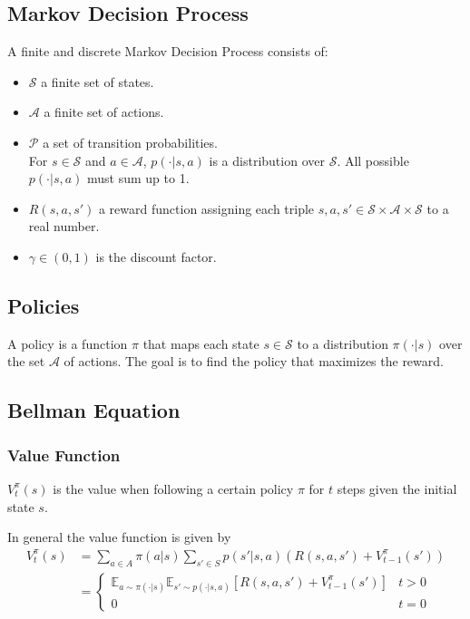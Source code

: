 
\subsection{Markov Decision Process}

A finite and discrete Markov Decision Process consists of:

\begin{itemize}
    \item $\mathcal{S}$ a finite set of states.
    \item $\mathcal{A}$ a finite set of actions.
    \item $\mathcal{P}$ a set of transition probabilities. \\ For $s \in \mathcal{S}$ and $a \in \mathcal{A}$, $p(\cdot | s,a)$ is a distribution over $\mathcal{S}$. All possible $p(\cdot | s,a)$ must sum up to 1.
    \item $R(s, a, s')$ a reward function assigning each triple $s, a, s' \in \mathcal{S} \times \mathcal{A} \times \mathcal{S}$ to a real number.
    \item $\gamma \in (0,1)$ is the discount factor.
\end{itemize}

\subsection{Policies}

A policy is a function $\pi$ that maps each state $s \in \mathcal{S}$ to a distribution $\pi(\cdot|s)$ over the set $\mathcal{A}$ of actions.
\newpar{}
The goal is to find the policy that maximizes the reward.

\subsection{Bellman Equation}
\subsubsection{Value Function}
$V_{t}^{\pi}(s)$ is the value when following a certain policy $\pi$ for $t$ steps given the initial state $s$.

\newpar{}

In general the value function is given by
\begin{align*}
    V_{t}^{\pi}(s) & = \sum_{a\in A}\pi(a|s) \sum_{s' \in S} p(s'|s,a)\left(R(s,a,s')+V_{t-1}^{\pi}(s')\right)                                                   \\
                   & = \begin{cases}
                           \mathbb{E}_{a \sim \pi(\cdot|s)} \mathbb{E}_{s' \sim p(\cdot|s, a)} \left[R(s,a,s') + V_{t-1}^{\pi}(s')\right] & t > 0 \\
                           0                                                                                                              & t=0
                       \end{cases}
\end{align*}

